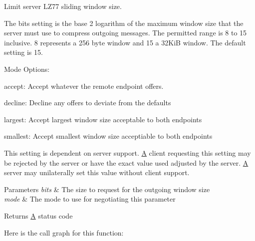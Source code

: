 Limit server L\+Z77 sliding window size. 

The bits setting is the base 2 logarithm of the maximum window size that the server must use to compress outgoing messages. The permitted range is 8 to 15 inclusive. 8 represents a 256 byte window and 15 a 32\+KiB window. The default setting is 15.

Mode Options\+:
\begin{DoxyItemize}
\item accept\+: Accept whatever the remote endpoint offers.
\item decline\+: Decline any offers to deviate from the defaults
\item largest\+: Accept largest window size acceptable to both endpoints
\item smallest\+: Accept smallest window size acceptiable to both endpoints
\end{DoxyItemize}

This setting is dependent on server support. \mbox{\hyperlink{struct_a}{A}} client requesting this setting may be rejected by the server or have the exact value used adjusted by the server. \mbox{\hyperlink{struct_a}{A}} server may unilaterally set this value without client support.


\begin{DoxyParams}{Parameters}
{\em bits} & The size to request for the outgoing window size \\
\hline
{\em mode} & The mode to use for negotiating this parameter \\
\hline
\end{DoxyParams}
\begin{DoxyReturn}{Returns}
\mbox{\hyperlink{struct_a}{A}} status code 
\end{DoxyReturn}
Here is the call graph for this function\+:
\mbox{\label{classwebsocketpp_1_1extensions_1_1permessage__deflate_1_1enabled_acf45724e34c174a0b8a5166192f659de}} 
